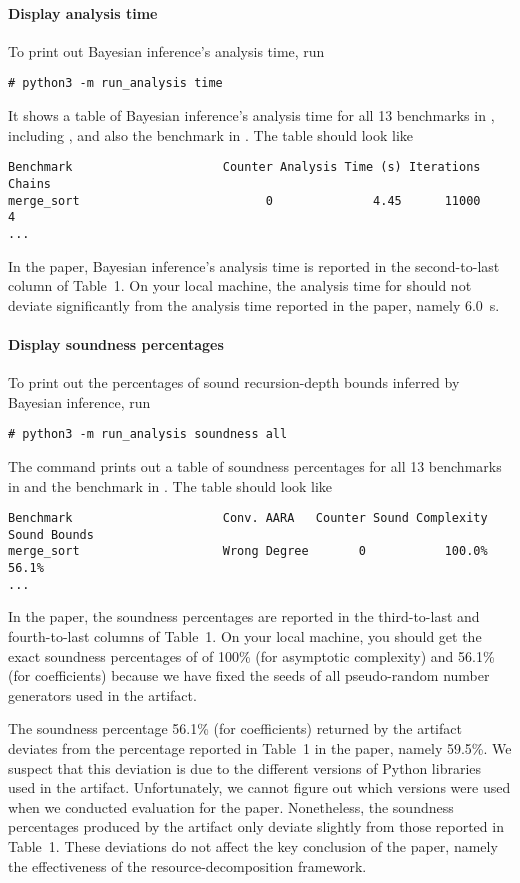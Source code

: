\paragraph{Display analysis time}

To print out Bayesian inference's analysis time, run
\begin{verbatim}
# python3 -m run_analysis time
\end{verbatim}
%
It shows a table of Bayesian inference's analysis time for all 13 benchmarks in
, including \mergesort{}, and also the
benchmark \quicksorttiml{} in .
%
The table should look like
\begin{verbatim}
Benchmark                     Counter Analysis Time (s) Iterations Chains
merge_sort                          0              4.45      11000      4
...
\end{verbatim}

In the paper, Bayesian inference's analysis time is reported in the
second-to-last column of Table~1.
%
On your local machine, the analysis time for \mergesort{} should not deviate
significantly from the analysis time reported in the paper, namely
\qty{6.0}{\second}.

\paragraph{Display soundness percentages}

To print out the percentages of sound recursion-depth bounds inferred by
Bayesian inference, run
\begin{verbatim}
# python3 -m run_analysis soundness all
\end{verbatim}
%
The command prints out a table of soundness percentages for all 13 benchmarks in
 and the benchmark \quicksorttiml{} in
.
%
The table should look like
\begin{verbatim}
Benchmark                     Conv. AARA   Counter Sound Complexity  Sound Bounds
merge_sort                    Wrong Degree       0           100.0%         56.1%
...
\end{verbatim}

In the paper, the soundness percentages are reported in the third-to-last and
fourth-to-last columns of Table~1.
%
On your local machine, you should get the exact soundness percentages of
\mergesort{} of 100\% (for asymptotic complexity) and  56.1\% (for coefficients)
because we have fixed the seeds of all pseudo-random number generators used in
the artifact.

The soundness percentage 56.1\% (for coefficients) returned by the artifact
deviates from the percentage reported in Table~1 in the paper, namely 59.5\%.
%
We suspect that this deviation is due to the different versions of Python
libraries used in the artifact.
%
Unfortunately, we cannot figure out which versions were used when we conducted
evaluation for the paper.
%
Nonetheless, the soundness percentages produced by the artifact only deviate
slightly from those reported in Table~1.
%
These deviations do not affect the key conclusion of the paper, namely the
effectiveness of the resource-decomposition framework.
